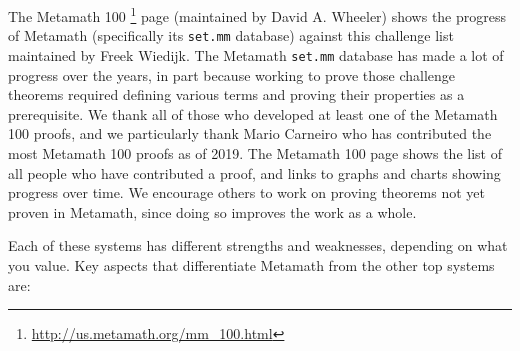 The Metamath 100%
\footnote{\url{http://us.metamath.org/mm\_100.html}}
page (maintained by David A. Wheeler)
shows the progress of Metamath (specifically its \texttt{set.mm} database)
against this challenge list maintained by Freek Wiedijk.
The Metamath \texttt{set.mm} database
has made a lot of progress over the years,
in part because working to prove those challenge theorems required
defining various terms and proving their properties as a prerequisite.
We thank all of those who developed at least one of the Metamath 100
proofs, and we particularly thank
Mario Carneiro
who has contributed the most Metamath 100 proofs as of 2019.
The Metamath 100 page shows the list of all people who have contributed a
proof, and links to graphs and charts showing progress over time.
We encourage others to work on proving theorems not yet proven in Metamath,
since doing so improves the work as a whole.

Each of these systems has different strengths and weaknesses, depending
on what you value.
Key aspects that differentiate Metamath from the other top systems are:

